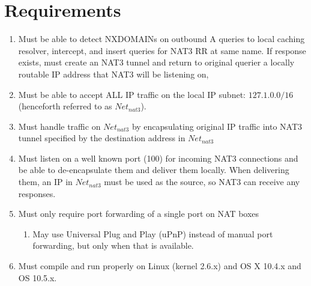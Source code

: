 \section{Requirements}\label{sec:reqs}

\begin{enumerate}
  \item Must be able to detect NXDOMAINs on outbound A queries to local caching resolver, intercept, and insert queries for NAT3 RR at same
name.  If response exists, must create an NAT3 tunnel and return to original querier a locally routable IP address that NAT3 will be
listening on,
  \item Must be able to accept ALL IP traffic on the local IP subnet: $127.1.0.0/16$ (henceforth referred to as $Net_{nat3}$).
  \item Must handle traffic on $Net_{nat3}$ by encapsulating original IP traffic into NAT3 tunnel specified by the destination address in
$Net_{nat3}$
  \item Must listen on a well known port (100) for incoming NAT3 connections and be able to de-encapsulate them and deliver them locally.
When delivering them, an IP in $Net_{nat3}$ must be used as the source, so NAT3 can receive any responses.
  \item Must only require port forwarding of a single port on NAT boxes
    \begin{enumerate}
      \item May use Universal Plug and Play (uPnP) instead of manual port forwarding, but only when that is available.
    \end{enumerate}
  \item Must compile and run properly on Linux (kernel 2.6.x) and OS X 10.4.x and OS 10.5.x.
\end{enumerate}
